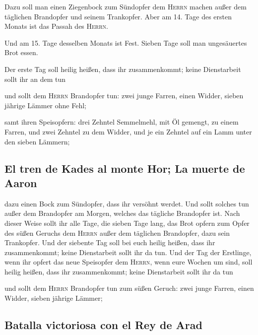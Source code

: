  Dazu soll man einen Ziegenbock zum Sündopfer dem
\textsc{Herrn} machen außer dem täglichen Brandopfer und seinem
Trankopfer.  Aber am 14. Tage des ersten Monats ist das
Passah des \textsc{Herrn}.

 Und am 15. Tage desselben Monats ist Fest. Sieben Tage
soll man ungesäuertes Brot essen.

 Der erste Tag soll heilig heißen, dass ihr
zusammenkommt; keine Dienstarbeit sollt ihr an dem tun

 und sollt dem \textsc{Herrn} Brandopfer tun: zwei junge
Farren, einen Widder, sieben jährige Lämmer ohne Fehl;

 samt ihren Speisopfern: drei Zehntel Semmelmehl, mit Öl
gemengt, zu einem Farren, und zwei Zehntel zu dem Widder,
 und je ein Zehntel auf ein Lamm unter den sieben
Lämmern;

\hypertarget{el-tren-de-kades-al-monte-hor-la-muerte-de-aaron}{%
\subsection{El tren de Kades al monte Hor; La muerte de
Aaron}\label{el-tren-de-kades-al-monte-hor-la-muerte-de-aaron}}

 dazu einen Bock zum Sündopfer, dass ihr versöhnt werdet.
 Und sollt solches tun außer dem Brandopfer am Morgen,
welches das tägliche Brandopfer ist.  Nach dieser Weise
sollt ihr alle Tage, die sieben Tage lang, das Brot opfern zum Opfer des
süßen Geruchs dem \textsc{Herrn} außer dem täglichen Brandopfer, dazu
sein Trankopfer.  Und der siebente Tag soll bei euch
heilig heißen, dass ihr zusammenkommt; keine Dienstarbeit sollt ihr da
tun.  Und der Tag der Erstlinge, wenn ihr opfert das neue
Speisopfer dem \textsc{Herrn}, wenn eure Wochen um sind, soll heilig
heißen, dass ihr zusammenkommt; keine Dienstarbeit sollt ihr da tun

 und sollt dem \textsc{Herrn} Brandopfer tun zum süßen
Geruch: zwei junge Farren, einen Widder, sieben jährige Lämmer;

\hypertarget{batalla-victoriosa-con-el-rey-de-arad}{%
\subsection{Batalla victoriosa con el Rey de
Arad}\label{batalla-victoriosa-con-el-rey-de-arad}}

